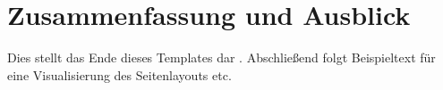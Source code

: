 \chapter{Zusammenfassung und Ausblick} \label{sec:summary}

Dies stellt das Ende dieses Templates dar \autocite{Surowiecki2005}.
Abschließend folgt Beispieltext für eine Visualisierung des Seitenlayouts etc.

\lipsum[1-18]{}
